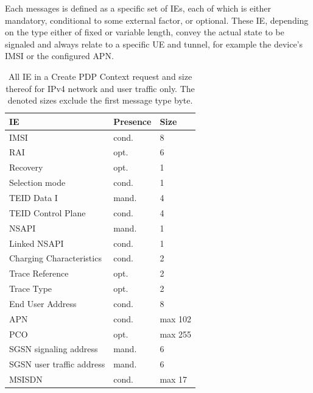 Each messages is defined as a specific set of \glspl{IE}, each of which is either mandatory, conditional to some external factor, or optional. These \gls{IE}, depending on the type either of fixed or variable length, convey the actual state to be signaled and always relate to a specific \gls{UE} and tunnel, for example the device's \gls{IMSI} or the configured \gls{APN}.

\begin{table}[htbp]
\caption{All \acrshort{IE} in a Create \acrshort{PDP} Context request and size thereof for \acrshort{IPv4} network and user traffic only. The denoted sizes exclude the first message type byte.}
\label{c4:tab:createrequestelements}
	\begin{tabu} to 0.49\textwidth{X[2.5]X[1.2]X[0.7]}
		\toprule
		\textbf{\gls{IE}} & \textbf{Presence} & \textbf{Size}\\
		\midrule
		\gls{IMSI} & cond. & \SI{8}{\byte} \\ 
		\acrshort{RAI} & opt. & \SI{6}{\byte} \\
		Recovery & opt. & \SI{1}{\byte} \\
		Selection mode	& cond. & \SI{1}{\byte} \\
		\gls{TEID} Data I & mand. & \SI{4}{\byte} \\
		\gls{TEID} Control Plane & cond. & \SI{4}{\byte} \\
		\gls{NSAPI} & mand. & \SI{1}{\byte} \\
		Linked \gls{NSAPI} & cond. & \SI{1}{\byte} \\
		Charging Characteristics & cond. & \SI{2}{\byte} \\
		Trace Reference & opt. & \SI{2}{\byte} \\
		Trace Type & opt. & \SI{2}{\byte} \\
		End User Address & cond. & \SI{8}{\byte} \\
		\gls{APN} & cond. & max \SI{102}{\byte} \\ %
		\acrshort{PCO} & opt. & max \SI{255}{\byte} \\ %
		\gls{SGSN} signaling address & mand.  & \SI{6}{\byte} \\ %
		\gls{SGSN} user traffic address & mand. & \SI{6}{\byte} \\ %
		\gls{MSISDN} & cond. & max \SI{17}{\byte} \\ %

\end{tabu}
\end{table}

